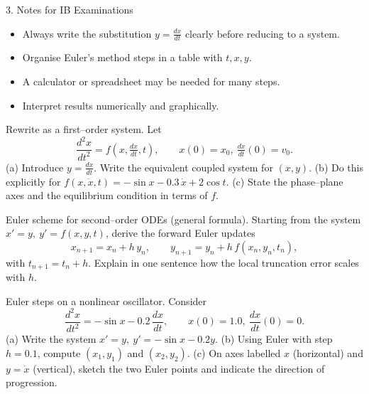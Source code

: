 \documentclass[11pt]{article}
\def\textbf#1{#1}%
\newcounter{question}
\begin{document}
\hrulefill

3. Notes for IB Examinations
\begin{itemize}
    \item Always write the substitution \(y = \frac{dx}{dt}\) clearly before reducing to a system.
    \item Organise Euler’s method steps in a table with \(t, x, y\).
    \item A calculator or spreadsheet may be needed for many steps.
    \item Interpret results numerically and graphically.
\end{itemize}

\newpage
\begin{question}
\textbf{Rewrite as a first–order system.}
Let
\[
\frac{d^{2}x}{dt^{2}}=f(x,\tfrac{dx}{dt},t),\qquad x(0)=x_{0},\ \tfrac{dx}{dt}(0)=v_{0}.
\]
(a) Introduce \(y=\tfrac{dx}{dt}\). Write the equivalent coupled system for \((x,y)\).  
(b) Do this explicitly for \(f(x,\dot x,t)=-\sin x-0.3\,\dot x+2\cos t\).  
(c) State the phase–plane axes and the equilibrium condition in terms of \(f\).
\end{question}

\begin{question}
\textbf{Euler scheme for second–order ODEs (general formula).}
Starting from the system \(x'=y,\ y'=f(x,y,t)\), derive the forward Euler updates
\[
x_{n+1}=x_n+h\,y_n,\qquad y_{n+1}=y_n+h\,f(x_n,y_n,t_n),
\]
with \(t_{n+1}=t_n+h\). Explain in one sentence how the local truncation error scales with \(h\).
\end{question}

\begin{question}
\textbf{Euler steps on a nonlinear oscillator.}
Consider
\[
\frac{d^{2}x}{dt^{2}}=-\sin x-0.2\,\frac{dx}{dt},\qquad x(0)=1.0,\ \frac{dx}{dt}(0)=0.
\]
(a) Write the system \(x'=y,\ y'=-\sin x-0.2y\).  
(b) Using Euler with step \(h=0.1\), compute \((x_1,y_1)\) and \((x_2,y_2)\).  
(c) On axes labelled \(x\) (horizontal) and \(y=\dot x\) (vertical), sketch the two Euler points and indicate the direction of progression.
\begin{center}
\end{center}
\end{question}
\end{document}
